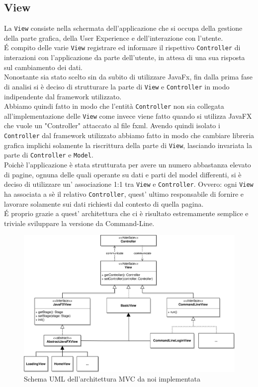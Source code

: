 \documentclass[a4paper,12pt]{report}
\begin{document}
\subsection{View}
La \texttt{View} consiste nella schermata dell'applicazione che si occupa della gestione della parte grafica, della User Experience e dell'interazione con l'utente.
\\
É compito delle varie \texttt{View} registrare ed informare il rispettivo \texttt{Controller} di interazioni con l'applicazione da parte dell'utente, in attesa di una sua risposta sul cambiamento dei dati.
\\
Nonostante sia stato scelto sin da subito di utilizzare JavaFx, fin dalla prima fase di analisi si è deciso di strutturare la parte di \texttt{View} e \texttt{Controller} in modo indipendente dal framework utilizzato.
\\
Abbiamo quindi fatto in modo che l'entità \texttt{Controller} non sia collegata all'implementazione delle \texttt{View} come invece viene fatto quando si utilizza JavaFX che vuole un "Controller" attaccato al file fxml.
Avendo quindi isolato i \texttt{Controller} dal framework utilizzato abbiamo fatto in modo che cambiare libreria grafica implichi solamente la riscrittura della parte di \texttt{View}, lasciando invariata la parte di \texttt{Controller} e \texttt{Model}.
\\
Poichè l'applicazione è stata strutturata per avere un numero abbastanza elevato di pagine, ognuna delle quali operante su dati e parti del model differenti, si è deciso di utilizzare un' associazione 1:1 tra \texttt{View} e \texttt{Controller}.
Ovvero: ogni \texttt{View} ha associata a sè il relativo \texttt{Controller}, quest' ultimo responsabile di fornire e lavorare solamente sui dati richiesti dal contesto di quella pagina.
\
\\
É proprio grazie a quest' architettura che ci è risultato estremamente semplice e triviale sviluppare la versione da Command-Line.

\begin{figure}[H]
    \begin{center}
        \centering
        \includegraphics[width=\textwidth]{img/MVC/view.png}
    \end{center}
    \caption{Schema UML dell'architettura MVC da noi implementata}
    \label{img:analysis4}
\end{figure}
\end{document}
